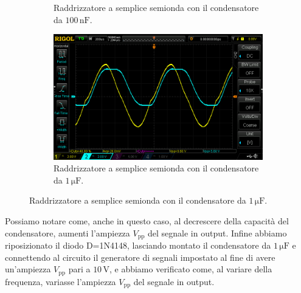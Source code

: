 \documentclass[a4paper]{article}
\begin{document}
\begin{figure}[h!]
\begin{subfigure}{0.4\textwidth}
						\caption{Raddrizzatore a semplice semionda con il condensatore da $ 100 \, \mathrm{nF} $.}
					\end{subfigure}
					\begin{subfigure}{1\textwidth}
						\centering
						\includegraphics[scale=0.3]{raddrizzatoreASempliceSemiondaDiodoDiZener1micro}
						\caption{Raddrizzatore a semplice semionda con il condensatore da $ 1 \, \mathrm{\mu F} $.}
					\end{subfigure}
					\label{fig:raddrizzatoreASempliceSemiondaDiodoDiZener}
				\end{figure}
				\newpage
				Possiamo notare come, anche in questo caso, al decrescere della capacità del condensatore, aumenti l'ampiezza $ V_{\mathrm{pp}} $ del segnale in output.
				\newline
				Infine abbiamo riposizionato il diodo D=1N4148, lasciando montato il condensatore da $ 1 \, \mathrm{\mu F} $ e connettendo al circuito il generatore di segnali impostato al fine di avere un'ampiezza $ V_{\mathrm{pp}} $ pari a $ 10 \, \mathrm{V} $, e abbiamo verificato come, al variare della frequenza, variasse l'ampiezza $ V_{\mathrm{pp}} $ del segnale in output.
\end{document}
